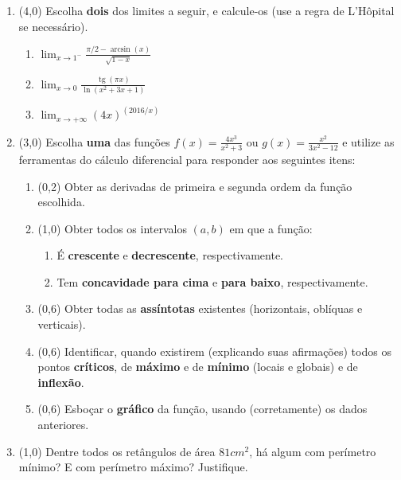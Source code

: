 \documentclass[12pt,a4paper]{article}
\newcommand*\tg{\operatorname{tg}}
\begin{document}
\begin{enumerate}
\item (4,0) Escolha \textbf{dois} dos limites a seguir, e calcule-os (use a regra de L'Hôpital se necessário).
\begin{multicols}{3}
\begin{enumerate}
\item $\displaystyle\lim_{x\to1^-} \frac{\pi/2 - \arcsin(x)}{\sqrt{1-x}}$
\item $\displaystyle\lim_{x\to 0} \frac{\tg(\pi x)}{\ln{(x^2+3x+1)}}$
\item $\displaystyle\lim_{x\to +\infty} (4x)^{(2016/x)}$
\end{enumerate}
\end{multicols}


\item (3,0) Escolha \textbf{uma} das funções $\displaystyle f(x) = \frac{4x^3}{x^2+3}$ ou $\displaystyle g(x) = \frac{x^2}{3x^2-12}$ e utilize as ferramentas do cálculo diferencial para responder aos seguintes itens:
\begin{enumerate}
\item (0,2) Obter as derivadas de primeira e segunda ordem da função escolhida.
\item (1,0) Obter todos os intervalos $(a,b)$ em que a função:
\begin{enumerate}
\item É \textbf{crescente} e \textbf{decrescente}, respectivamente.
\item Tem \textbf{concavidade para cima} e \textbf{para baixo}, respectivamente.
\end{enumerate}
\item (0,6) Obter todas as \textbf{assíntotas} existentes (horizontais, oblíquas e verticais).
\item (0,6) Identificar, quando existirem (explicando suas afirmações) todos os pontos \textbf{críticos}, de \textbf{máximo} e de \textbf{mínimo} (locais e globais) e de \textbf{inflexão}.
\item (0,6) Esboçar o \textbf{gráfico} da função, usando (corretamente) os dados anteriores.
\end{enumerate}

\item (1,0) Dentre todos os retângulos de área $81 cm^2$, há algum com perímetro mínimo? E com perímetro máximo? Justifique.


\end{enumerate}
\end{document}
